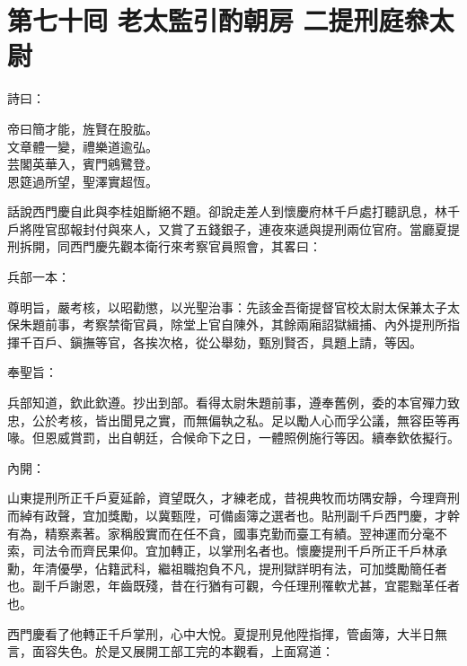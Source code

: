 
\chapter*{第七十囘 老太監引酌朝房 二提刑庭叅太尉}


詩曰：

\begin{myquote} 
帝曰簡才能，旌賢在股肱。\\文章體一變，禮樂道逾弘。\\芸閣英華入，賓門鵷鷺登。\\恩筵過所望，聖澤實超恆。
\end{myquote} 

話說西門慶自此與李桂姐斷絕不題。卻說走差人到懷慶府林千戶處打聽訊息，林千戶將陞官邸報封付與來人，又賞了五錢銀子，連夜來遞與提刑兩位官府。當廳夏提刑拆開，同西門慶先觀本衛行來考察官員照會，其畧曰：

\begin{myquote}[\markfont]
兵部一本：

尊明旨，嚴考核，以昭勸懲，以光聖治事：先該金吾衛提督官校太尉太保兼太子太保朱題前事，考察禁衛官員，除堂上官自陳外，其餘兩廂詔獄緝捕、內外提刑所指揮千百戶、鎭撫等官，各挨次格，從公舉劾，甄別賢否，具題上請，等因。

奉聖旨：

兵部知道，欽此欽遵。抄出到部。看得太尉朱題前事，遵奉舊例，委的本官殫力致忠，公於考核，皆出聞見之實，而無偏執之私。足以勵人心而孚公議，無容臣等再喙。但恩威賞罰，出自朝廷，合候命下之日，一體照例施行等因。續奉欽依擬行。

內開：

山東提刑所正千戶夏延齡，資望既久，才練老成，昔視典牧而坊隅安靜，今理齊刑而綽有政聲，宜加獎勵，以冀甄陞，可備鹵簿之選者也。貼刑副千戶西門慶，才幹有為，精察素著。家稱殷實而在任不貪，國事克勤而臺工有績。翌神運而分毫不索，司法令而齊民果仰。宜加轉正，以掌刑名者也。懷慶提刑千戶所正千戶林承勳，年清優學，佔籍武科，繼祖職抱負不凡，提刑獄詳明有法，可加獎勵簡任者也。副千戶謝恩，年齒既殘，昔在行猶有可觀，今任理刑罹軟尤甚，宜罷黜革任者也。
\end{myquote} 

西門慶看了他轉正千戶掌刑，心中大悅。夏提刑見他陞指揮，管鹵簿，大半日無言，面容失色。於是又展開工部工完的本觀看，上面寫道：

